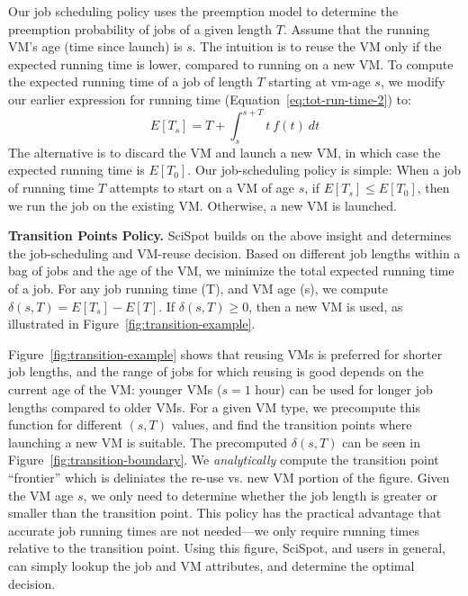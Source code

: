 \documentclass[compsoc]{IEEEtran}
\begin{document}
Our job scheduling policy uses the preemption model to determine the preemption probability of jobs of a given length $T$. 
Assume that the running VM's age (time since launch) is $s$.
The intuition is to reuse the VM only if the expected running time is lower, compared to running on a new VM. 
To compute the expected running time of a job of length $T$ starting at vm-age $s$, we  modify our earlier expression for running time (Equation~\ref{eq:tot-run-time-2}) to: 
\begin{equation}
  \label{eq:tot-run-time-s}
    E[T_s]  = T + \int_{s}^{s+T} t~f(t)~dt
  \end{equation}
The alternative is to discard the VM and launch a new VM, in which case the expected running time is $E[T_0]$. Our job-scheduling policy is simple: 
When a job of running time $T$ attempts to start on a VM of age $s$, if $E[T_s] \leq E[T_0]$, then we run the job on the existing VM.
Otherwise, a new VM is launched.









\noindent \textbf{Transition Points Policy.}
SciSpot builds on the above insight and determines the job-scheduling and VM-reuse decision. 
Based on different job lengths within a bag of jobs and the age of the VM, we minimize the total expected running time of a job.
For any job running time (T), and VM age (s), we compute  $\delta(s,T) = E[T_s] - E[T]$.
If $\delta(s,T) \geq 0$, then a new VM is used, as illustrated in Figure~\ref{fig:transition-example}.


Figure~\ref{fig:transition-example} shows that reusing VMs is preferred for shorter job lengths, and the range of jobs for which reusing is good depends on the current age of the VM: younger VMs ($s=1$ hour) can be used for longer job lengths compared to older VMs. 
For a given VM type, we precompute this function for different $(s, T)$ values, and find the transition points where launching a new VM is suitable. 
The precomputed $\delta(s,T)$ can be seen in Figure~\ref{fig:transition-boundary}.
We \emph{analytically} compute the transition point ``frontier'' which is deliniates the re-use vs. new VM portion of the figure. 
Given the VM age $s$, we only need to determine whether the job length is greater or smaller than the transition point. 
This policy has the practical advantage that accurate job running times are not needed---we only require running times relative to the transition point. 
Using this figure, SciSpot, and users in general, can simply lookup the job and VM attributes, and determine the optimal decision. 
\end{document}
